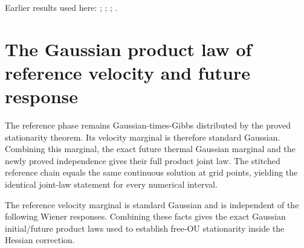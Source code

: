 \documentclass[11pt,a4paper]{article}
\begin{document}
Earlier results used here: \cite[Section~3.13.2]{LangevinLean2026ULASC}; \cite[Section~3.13.5]{LangevinLean2026ULASC}; \cite[Section~3.17.1]{LangevinLean2026ULASC}; \cite[Section~3.8.17]{LangevinLean2026ULASC}.

\section{\texorpdfstring{The Gaussian product law of reference velocity and future response}{The Gaussian product law of reference velocity and future response}}


The reference phase remains Gaussian-times-Gibbs distributed by the proved stationarity theorem. Its velocity marginal is therefore standard Gaussian. Combining this marginal, the exact future thermal Gaussian marginal and the newly proved independence gives their full product joint law. The stitched reference chain equals the same continuous solution at grid points, yielding the identical joint-law statement for every numerical interval.



The reference velocity marginal is standard Gaussian and is independent of the following Wiener responses. Combining these facts gives the exact Gaussian initial/\allowbreak{}future product laws used to establish free-OU stationarity inside the Hessian correction.
\end{document}
